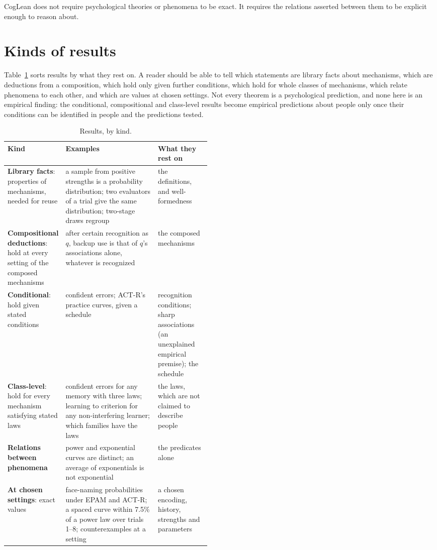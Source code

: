 \documentclass[11pt]{article}
\begin{document}
CogLean does not require psychological theories or phenomena to be exact. It requires the relations asserted between them to be explicit enough to reason about.

\section{Kinds of results}
\label{sec:kinds}

Table~\ref{tab:kinds} sorts results by what they rest on. A reader should be able to tell which statements are library facts about mechanisms, which are deductions from a composition, which hold only given further conditions, which hold for whole classes of mechanisms, which relate phenomena to each other, and which are values at chosen settings. Not every theorem is a psychological prediction, and none here is an empirical finding: the conditional, compositional and class-level results become empirical predictions about people only once their conditions can be identified in people and the predictions tested.

\begin{table}[t]
\centering
\small
\begin{tabularx}{\linewidth}{@{}p{0.21\linewidth}Xp{0.26\linewidth}@{}}
\toprule
Kind & Examples & What they rest on \\
\midrule
\textbf{Library facts}: properties of mechanisms, needed for reuse & a sample from positive strengths is a probability distribution; two evaluators of a trial give the same distribution; two-stage draws regroup & the definitions, and well-formedness \\
\addlinespace
\textbf{Compositional deductions}: hold at every setting of the composed mechanisms & after certain recognition as $q$, backup use is that of $q$'s associations alone, whatever is recognized & the composed mechanisms \\
\addlinespace
\textbf{Conditional}: hold given stated conditions & confident errors; ACT-R's practice curves, given a schedule & recognition conditions; sharp associations (an unexplained empirical premise); the schedule \\
\addlinespace
\textbf{Class-level}: hold for every mechanism satisfying stated laws & confident errors for any memory with three laws; learning to criterion for any non-interfering learner; which families have the laws & the laws, which are not claimed to describe people \\
\addlinespace
\textbf{Relations between phenomena} & power and exponential curves are distinct; an average of exponentials is not exponential & the predicates alone \\
\addlinespace
\textbf{At chosen settings}: exact values & face-naming probabilities under EPAM and ACT-R; a spaced curve within 7.5\% of a power law over trials 1--8; counterexamples at a setting & a chosen encoding, history, strengths and parameters \\
\bottomrule
\end{tabularx}
\caption{Results, by kind.}
\label{tab:kinds}
\end{table}
\end{document}

